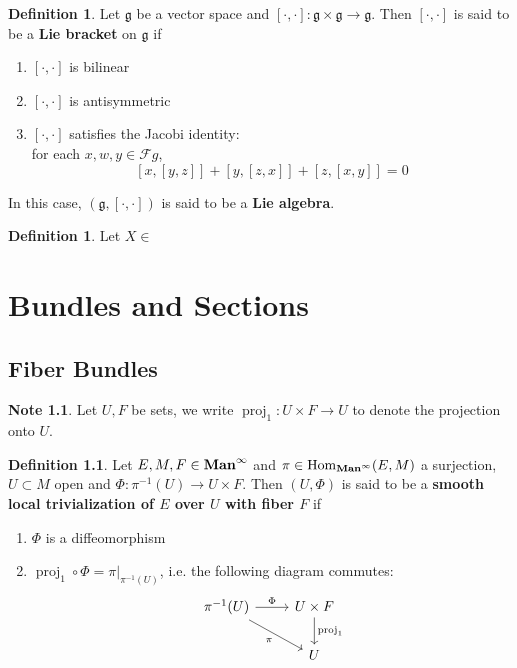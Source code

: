 \documentclass{book}
\theoremstyle{definition}
\newtheorem{defn}[definition]{Definition}
\newtheorem{note}[definition]{Note}
\newcommand{\MF}{\mathcal{F}}
\newcommand{\MFg}{\mathfrak{g}}
\DeclareMathOperator{\Hom}{Hom}
\DeclareMathOperator{\prj}{\text{proj}}
\DeclareMathOperator*{\Maninf}{\text{\tbf{Man}}^{\infty}}
\DeclareMathOperator*{\0}{\mbf{0}}
\DeclareMathOperator*{\1}{\mbf{1}}
\newcommand{\tbf}[1]{\textbf{#1}}
\begin{document}
	\begin{defn}
		Let $\MFg$ be a vector space and $[\cdot, \cdot]: \MFg \times \MFg \rightarrow \MFg$. 
		Then $[\cdot, \cdot]$ is said to be a \tbf{Lie bracket} on $\MFg$ if  
		\begin{enumerate}
			\item $[\cdot, \cdot]$ is bilinear
			\item $[\cdot, \cdot]$ is antisymmetric
			\item $[\cdot, \cdot]$ satisfies the Jacobi identity: \\
			for each $x, w, y \in \MF g$, 
			$$[x, [y,z]] + [y, [z,x]] + [z, [x,y]] = 0$$
		\end{enumerate}
		In this case, $(\MFg, [\cdot, \cdot])$ is said to be a \tbf{Lie algebra}.
	\end{defn}

	\begin{defn}
		Let $X \in $
	\end{defn}
	
	
	
	
	
	
	
	
	
	
	
	
	
	
	
	
	
	
	
	
	
	
	
	
	
	
	\newpage
	\chapter{Bundles and Sections}
	
	\section{Fiber Bundles}
	
	\begin{note}
		Let $U, F$ be sets, we write $\prj_1: U \times F \rightarrow U$ to denote the projection onto $U$.
	\end{note}
	
	\begin{defn}
		Let $E, M, F \in \Maninf$ and $\pi \in \Hom_{\Maninf}(E, M)$ a surjection, $U \subset M$ open and $\Phi: \pi^{-1}(U) \rightarrow U \times F$. Then $(U, \Phi)$ is said to be a \tbf{smooth local trivialization of $E$ over $U$ with fiber $F$}  if 
		\begin{enumerate}
			\item $\Phi$ is a diffeomorphism
			\item $\prj_1 \circ \Phi = \pi|_{\pi^{-1}(U)}$, i.e. the following diagram commutes:
			\[ 
			\begin{tikzcd}
			\pi^{-1}(U) \arrow[r, "\Phi"] \arrow[dr, "\pi"'] & U \times F \arrow[d, "\prj_1"]  \\
			& U
			\end{tikzcd}
			\]
		\end{enumerate}
	\end{defn}
\end{document}
